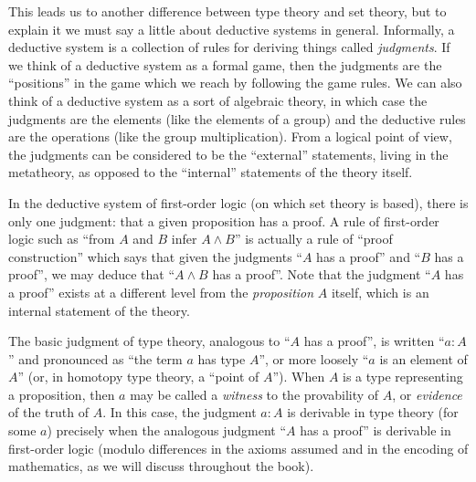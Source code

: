 This leads us to another difference between type theory and set theory, but to explain it we must say a little about deductive systems in general.
Informally, a deductive system is a collection of rules for deriving things called \emph{judgments}.
If we think of a deductive system as a formal game, then the judgments are the ``positions'' in the game which we reach by following the game rules.
We can also think of a deductive system as a sort of algebraic theory, in which case the judgments are the elements (like the elements of a group) and the deductive rules are the operations (like the group multiplication).
From a logical point of view, the judgments can be considered to be the ``external'' statements, living in the metatheory, as opposed to the ``internal'' statements of the theory itself.

In the deductive system of first-order logic (on which set theory is based), there is only one judgment: that a given proposition has a proof.
A rule of first-order logic such as ``from $A$ and $B$ infer $A\wedge B$'' is actually a rule of ``proof construction'' which says that given the judgments ``$A$ has a proof'' and ``$B$ has a proof'', we may deduce that ``$A\wedge B$ has a proof''.
Note that the judgment ``$A$ has a proof'' exists at a different level from the \emph{proposition} $A$ itself, which is an internal statement of the theory.

The basic judgment of type theory, analogous to ``$A$ has a proof'', is written ``$a:A$'' and pronounced as ``the term $a$ has type $A$'', or more loosely ``$a$ is an element of $A$'' (or, in homotopy type theory, a ``point of $A$'').
When $A$ is a type representing a proposition, then $a$ may be called a \emph{witness} to the provability of $A$, or \emph{evidence} of the truth of $A$.
In this case, the judgment $a:A$ is derivable in type theory (for some $a$) precisely when the analogous judgment ``$A$ has a proof'' is derivable in first-order logic (modulo differences in the axioms assumed and in the encoding of mathematics, as we will discuss throughout the book).

